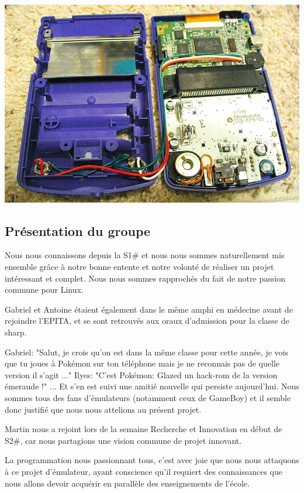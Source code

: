 \documentclass[12pt, a4paper]{article}
\begin{document}
\begin{center}
\includegraphics[width= 13.5cm]{gtainside.JPG}
\end{center}


\pagebreak



\subsection{Présentation du groupe}
\bigskip
Nous nous connaissons depuis la S1\# et nous nous sommes naturellement mis ensemble grâce à notre bonne entente et notre volonté de réaliser un projet intéressant et complet. Nous nous sommes rapprochés du fait de notre passion commune pour Linux. 
\medskip

Gabriel et Antoine étaient également dans le même amphi en médecine avant de rejoindre l'EPITA, et se sont retrouvés aux oraux d'admission pour la classe de sharp.
\medskip

Gabriel: "Salut, je crois qu'on est dans la même classe pour cette année, je vois que tu joues à Pokémon sur ton téléphone mais je ne reconnais pas de quelle version il s'agit ..." 
Ilyes: "C'est Pokémon: Glazed un hack-rom de la version émeraude !"
... Et s'en est suivi une amitié nouvelle qui persiste aujourd'hui. Nous sommes tous des fans d'émulateurs (notamment ceux de GameBoy) et il semble donc justifié que nous nous attelions au présent projet.
\medskip

Martin nous a rejoint lors de la semaine Recherche et Innovation en début de S2\#, car nous partagions une vision commune de projet innovant.
\medskip

La programmation nous passionnant tous, c’est avec joie que nous nous attaquons à ce projet d’émulateur, ayant conscience qu’il requiert des connaissances que nous allons devoir acquérir en parallèle des enseignements de l'école.
\medskip
\end{document}
